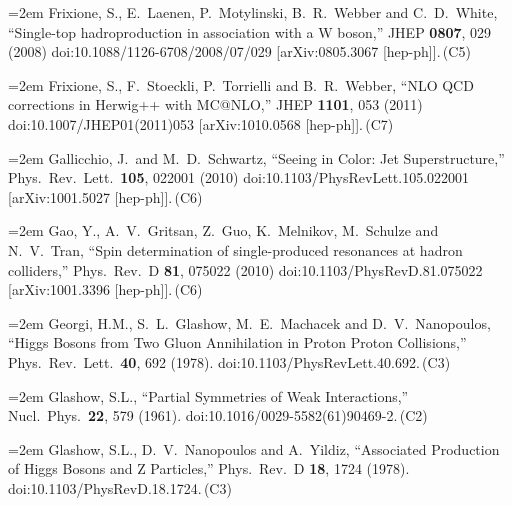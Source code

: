 \documentclass[letter,12pt]{article}
\def\xbibitem#1#2#3{\noindent\hangindent=2em #2\,(#3)}
\begin{document}
\xbibitem{Frixione:2008yi}{Frixione, S., E.~Laenen, P.~Motylinski, B.~R.~Webber and C.~D.~White,
  ``Single-top hadroproduction in association with a W boson,''
  JHEP {\bf 0807}, 029 (2008)
  doi:10.1088/1126-6708/2008/07/029
  [arXiv:0805.3067 [hep-ph]].}{C5}
  
  
\xbibitem{Frixione:2010ra}{Frixione, S., F.~Stoeckli, P.~Torrielli and B.~R.~Webber,
  ``NLO QCD corrections in Herwig++ with MC@NLO,''
  JHEP {\bf 1101}, 053 (2011)
  doi:10.1007/JHEP01(2011)053
  [arXiv:1010.0568 [hep-ph]].}{C7}

\xbibitem{Gallicchio:2010sw}{Gallicchio, J.\ and M.~D.~Schwartz,
  ``Seeing in Color: Jet Superstructure,''
  Phys.\ Rev.\ Lett.\  {\bf 105}, 022001 (2010)
  doi:10.1103/PhysRevLett.105.022001
  [arXiv:1001.5027 [hep-ph]].}{C6}
  
\xbibitem{Gao:2010qx}{Gao, Y., A.~V.~Gritsan, Z.~Guo, K.~Melnikov, M.~Schulze and N.~V.~Tran,
  ``Spin determination of single-produced resonances at hadron colliders,''
  Phys.\ Rev.\ D {\bf 81}, 075022 (2010)
  doi:10.1103/PhysRevD.81.075022
  [arXiv:1001.3396 [hep-ph]].}{C6}
  
\xbibitem{Georgi:1977gs}{Georgi, H.M., S.~L.~Glashow, M.~E.~Machacek and D.~V.~Nanopoulos,
  ``Higgs Bosons from Two Gluon Annihilation in Proton Proton Collisions,''
  Phys.\ Rev.\ Lett.\  {\bf 40}, 692 (1978).
  doi:10.1103/PhysRevLett.40.692.}{C3}
  
\xbibitem{Glashow:1961tr}{Glashow, S.L.,
  ``Partial Symmetries of Weak Interactions,''
  Nucl.\ Phys.\  {\bf 22}, 579 (1961).
  doi:10.1016/0029-5582(61)90469-2.}{C2}
  
\xbibitem{Glashow:1978ab}{Glashow, S.L., D.~V.~Nanopoulos and A.~Yildiz,
  ``Associated Production of Higgs Bosons and Z Particles,''
  Phys.\ Rev.\ D {\bf 18}, 1724 (1978).
  doi:10.1103/PhysRevD.18.1724.}{C3}
  
\end{document}
